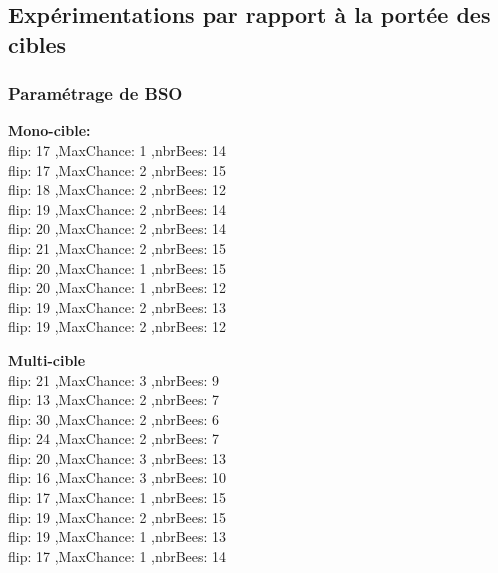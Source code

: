 \subsection{Expérimentations par rapport à la portée des cibles}
\subsubsection{Paramétrage de BSO} 

\noindent
\begin{minipage}[t]{0.5\textwidth}
	\textbf{Mono-cible:} \\
	flip: 17 ,MaxChance: 1 ,nbrBees: 14\\
	flip: 17 ,MaxChance: 2 ,nbrBees: 15\\
	flip: 18 ,MaxChance: 2 ,nbrBees: 12\\
	flip: 19 ,MaxChance: 2 ,nbrBees: 14\\
	flip: 20 ,MaxChance: 2 ,nbrBees: 14\\
	flip: 21 ,MaxChance: 2 ,nbrBees: 15\\
	flip: 20 ,MaxChance: 1 ,nbrBees: 15\\
	flip: 20 ,MaxChance: 1 ,nbrBees: 12\\
	flip: 19 ,MaxChance: 2 ,nbrBees: 13\\
	flip: 19 ,MaxChance: 2 ,nbrBees: 12\\
\end{minipage}\hfill
\hspace{0.5cm}
\begin{minipage}[t]{0.5\textwidth}
	\textbf{Multi-cible}\\
	flip: 21 ,MaxChance: 3 ,nbrBees: 9\\
	flip: 13 ,MaxChance: 2 ,nbrBees: 7\\
	flip: 30 ,MaxChance: 2 ,nbrBees: 6\\
	flip: 24 ,MaxChance: 2 ,nbrBees: 7\\
	flip: 20 ,MaxChance: 3 ,nbrBees: 13\\
	flip: 16 ,MaxChance: 3 ,nbrBees: 10\\
	flip: 17 ,MaxChance: 1 ,nbrBees: 15\\
	flip: 19 ,MaxChance: 2 ,nbrBees: 15\\
	flip: 19 ,MaxChance: 1 ,nbrBees: 13\\
	flip: 17 ,MaxChance: 1 ,nbrBees: 14\\
\end{minipage}\hfill





